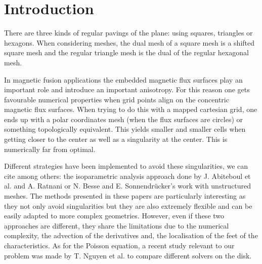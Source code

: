 \documentclass[proc]{edpsmath}
\begin{document}
\maketitle


\section*{Introduction}


There are three kinds of regular pavings of the plane: using squares, triangles or hexagons. When considering meshes, the dual mesh of a square mesh is a shifted square mesh and the regular triangle mesh is the dual of the regular hexagonal mesh.

In magnetic fusion applications the embedded magnetic flux surfaces play an important role and introduce an important anisotropy\cite{Angelino2009}. For this reason one gets favourable numerical properties when grid points align on the concentric magnetic flux surfaces. When trying to do this with a mapped cartesian grid, one ends up with a polar coordinates mesh (when the flux surfaces are circles) or something topologically equivalent. This yields smaller and smaller cells when getting closer to the center as well as a singularity at the center. This is numerically far from optimal. 

Different strategies have been implemented to avoid these singularities, we can cite among others: the isoparametric analysis approach done by J. Abiteboul et al. \cite{abiteboul2011solving} and A. Ratnani \cite{ratnani2011isogeometric} or N. Besse and E. Sonnendr\"{u}cker's work with unstructured meshes\cite{Besse2003341}. The methods presented in these papers are particularly interesting as  they not only avoid singularities but they are also extremely flexible and can be easily adapted to more complex geometries. However, even if these two approaches are different, they share the limitations due to the numerical complexity, the advection of the derivatives and, the localisation of the feet of the characteristics. 
As for the Poisson equation, a recent study relevant to our problem was made by T. Nguyen et al.\cite{axioms3020280} to compare different solvers on the disk. 
\end{document}

